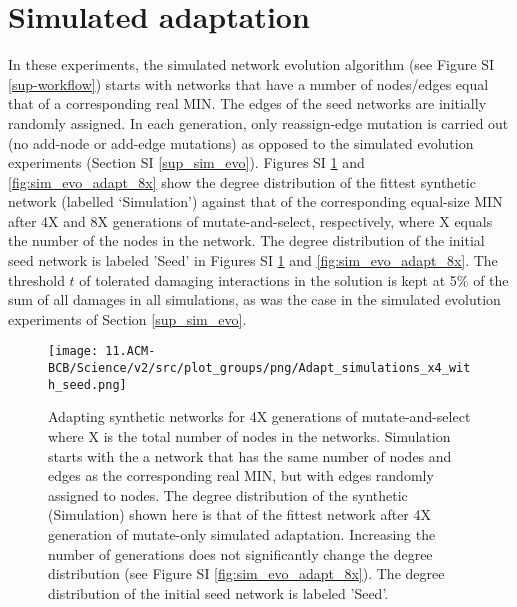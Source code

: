 

\newpage
\section{Simulated adaptation}\label{sup_sim_adapt}
        In these experiments, the simulated network evolution algorithm (see Figure SI \ref{sup-workflow}) starts with networks that have a number of nodes/edges equal that of a corresponding real MIN. The edges of the seed networks are initially randomly assigned. In each generation, only reassign-edge mutation is carried out (no add-node or add-edge mutations) as opposed to the simulated evolution experiments (Section SI \ref{sup_sim_evo}). Figures SI \ref{fig:sim_evo_adapt_4x} and \ref{fig:sim_evo_adapt_8x} show the degree distribution of the fittest synthetic network (labelled `Simulation') against that of the corresponding equal-size MIN after 4X and 8X generations of mutate-and-select, respectively, where  X equals the number of the nodes in the network. The degree distribution of the initial seed network is labeled 'Seed' in Figures SI \ref{fig:sim_evo_adapt_4x} and \ref{fig:sim_evo_adapt_8x}. The threshold $t$ of tolerated damaging interactions in the solution is kept at 5\% of the sum of all damages in all simulations, as was the case in the simulated evolution experiments of Section \ref{sup_sim_evo}.

    	\begin{figure}[H]%
    			\centering
    					\texttt{[image: 11.ACM-BCB/Science/v2/src/plot\_groups/png/Adapt\_simulations\_x4\_with\_seed.png]}
    					\caption
                            {
                                Adapting synthetic networks for 4X generations of mutate-and-select where X is the total number of nodes in the networks. Simulation starts with the a network that has the same number of nodes and edges as the corresponding real MIN, but with edges randomly assigned to nodes. The  degree distribution of the synthetic (Simulation) shown here is that of the fittest network after 4X generation of mutate-only simulated adaptation. Increasing the number of generations does not significantly change the degree distribution (see Figure SI \ref{fig:sim_evo_adapt_8x}). The degree distribution of the initial seed network is labeled 'Seed'.
                            }
    					\label{fig:sim_evo_adapt_4x}
    	\end{figure}

